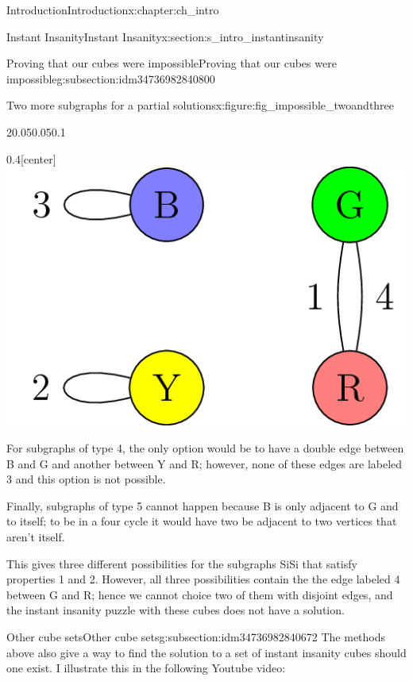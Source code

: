 \documentclass[oneside,10pt,]{book}
\numberwithin{equation}{section}
\newlength{\qrsize}
\newlength{\previewwidth}
\begin{document}
\begin{chapterptx}{Introduction}{}{Introduction}{}{}{x:chapter:ch_intro}
\begin{sectionptx}{Instant Insanity}{}{Instant Insanity}{}{}{x:section:s_intro_instantinsanity}
\begin{subsectionptx}{Proving that our cubes were impossible}{}{Proving that our cubes were impossible}{}{}{g:subsection:idm34736982840800}
\begin{figureptx}{Two more subgraphs for a partial solutions}{x:figure:fig_impossible_twoandthree}{}
\begin{sidebyside}{2}{0.05}{0.05}{0.1}
\begin{sbspanel}{0.4}[center]%
\includegraphics[width=\linewidth]{images/InstantInsanityImpossibleThird.png}
\end{sbspanel}%
\end{sidebyside}%
\tcblower
\end{figureptx}%
For subgraphs of type 4, the only option would be to have a double edge between B and G and another between Y and R; however, none of these edges are labeled 3 and this option is not possible.%
\par
Finally, subgraphs of type 5 cannot happen because B is only adjacent to G and to itself; to be in a four cycle it would have two be adjacent to two vertices that aren’t itself.%
\par
This gives three different possibilities for the subgraphs SiSi that satisfy properties 1 and 2. However, all three possibilities contain the the edge labeled 4 between G and R; hence we cannot choice two of them with disjoint edges, and the instant insanity puzzle with these cubes does not have a solution.%
\end{subsectionptx}
%
%
\typeout{************************************************}
\typeout{************************************************}
%
\begin{subsectionptx}{Other cube sets}{}{Other cube sets}{}{}{g:subsection:idm34736982840672}
The methods above also give a way to find the solution to a set of instant insanity cubes should one exist.  I illustrate this in the following Youtube video:%
\setlength{\qrsize}{9em}
\setlength{\previewwidth}{\linewidth}
\addtolength{\previewwidth}{-\qrsize}
\begin{tcbraster}[raster columns=2, raster column skip=1pt, raster halign=center, raster force size=false, raster left skip=0pt, raster right skip=0pt]%

\end{tcbraster}
\end{subsectionptx}
\end{sectionptx}
\end{chapterptx}
\end{document}
